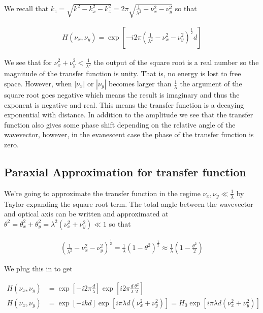 \documentclass[12pt]{article}
\begin{document}
We recall that $k_z = \sqrt{k^2 - k_x^2 - k_z^2} = 2\pi \sqrt{\frac{1}{\lambda^2} - \nu_x^2 - \nu_y^2}$ so that 

\begin{align}
H(\nu_x,\nu_y) = \exp\left[-i 2\pi \left(\frac{1}{\lambda^2} - \nu_x^2 - \nu_y^2\right)^{\frac{1}{2}} d\right]
\end{align}

We see that for $\nu_x^2+\nu_y^2<\frac{1}{\lambda^2}$ the output of the square root is a real number so the magnitude of the transfer function is unity. That is, no energy is lost to free space. However, when $|\nu_x|$ or $|\nu_y|$ becomes larger than $\frac{1}{\lambda}$ the argument of the square root goes negative which means the result is imaginary and thus the exponent is negative and real. This means the transfer function is a decaying exponential with distance. In addition to the amplitude we see that the transfer function also gives some phase shift depending on the relative angle of the wavevector, however, in the evanescent case the phase of the transfer function is zero.

\subsection{Paraxial Approximation for transfer function}

We're going to approximate the transfer function in the regime $\nu_x, \nu_y \ll \frac{1}{\lambda}$ by Taylor expanding the square root term. The total angle between the wavevector and optical axis can be written and approximated at $\theta^2 = \theta_x^2 + \theta_y^2 = \lambda^2(\nu_x^2+\nu_y^2) \ll 1$ so that

\begin{align}
\left(\frac{1}{\lambda^2} - \nu_x^2 - \nu_y^2\right)^{\frac{1}{2}} = \frac{1}{\lambda} \left(1 - \theta^2\right)^{\frac{1}{2}} \approx \frac{1}{\lambda}\left(1-\frac{\theta^2}{2}\right)
\end{align}

We plug this in to get

\begin{align}
H(\nu_x,\nu_y) &= \exp\left[-i 2\pi \frac{d}{\lambda}\right] \exp\left[i 2 \pi \frac{d}{\lambda} \frac{\theta^2}{2}\right]\\
H(\nu_x,\nu_y) &= \exp\left[-ik d\right] \exp\left[ i \pi \lambda d (\nu_x^2+\nu_y^2)\right] = H_0 \exp\left[i \pi \lambda d (\nu_x^2+\nu_y^2)\right]
\end{align}
\end{document}
